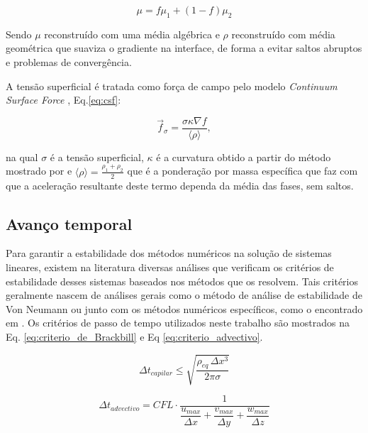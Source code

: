 \begin{equation}
    \mu = f \mu_1 + (1-f) \mu_2
    \label{eq:mu-reconstruido}
\end{equation}

Sendo $\mu$ reconstruído com uma média algébrica e $\rho$ reconstruído com média geométrica que suaviza o gradiente na interface, de forma a evitar saltos abruptos e problemas de convergência. 

A tensão superficial é tratada como força de campo pelo modelo \textit{Continuum Surface Force} \citep{Brackbill1992}, Eq.\ref{eq:csf}: 

\begin{equation}
    \vec{f}_{\sigma} = \frac{\sigma \kappa \nabla f}{\langle \rho \rangle},
    \label{eq:csf}
\end{equation}

na qual $\sigma$ é a tensão superficial, $\kappa$ é a curvatura obtido a partir do método mostrado por \citet{Shirani2004} e ${\langle \rho \rangle = \frac{\rho_1 + \rho_2}{2}}$ que é a ponderação por massa específica que faz com que a aceleração resultante deste termo dependa da média das fases, sem saltos.


\subsection{Avanço temporal}
\label{sec:passo-tempo}
Para garantir a estabilidade dos métodos numéricos na solução de sistemas lineares, existem na literatura diversas análises que verificam os critérios de estabilidade desses sistemas baseados nos métodos que os resolvem. Tais critérios geralmente nascem de análises gerais como o método de análise de estabilidade de Von Neumann ou junto com os métodos numéricos específicos, como o encontrado em \citet{Brackbill1992}. Os critérios de passo de tempo utilizados neste trabalho são mostrados na Eq. \ref{eq:criterio_de_Brackbill} e Eq \ref{eq:criterio_advectivo}.

\begin{equation}
    \Delta t_{capilar} \leq \sqrt{\frac{\rho_{eq}\,\Delta x^3}{2 \pi \sigma}}
    \label{eq:criterio_de_Brackbill}
\end{equation}

\begin{equation}
    \Delta t_{advectivo} = CFL \cdot \frac{1}{\dfrac{u_{max}}{\Delta x} + \dfrac{v_{max}}{\Delta y} + \dfrac{w_{max}}{\Delta z}}
    \label{eq:criterio_advectivo}
\end{equation}


